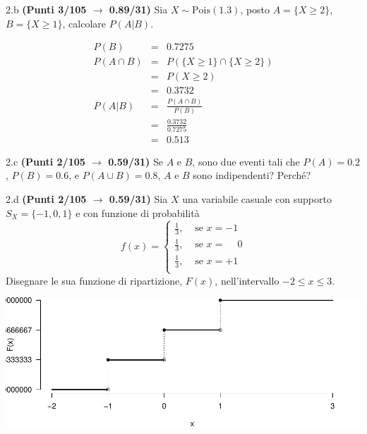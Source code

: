 \documentclass[
  11pt,
]{book}
\theoremstyle{mytheoremstyle}
\theoremstyle{mydefstyle}
\newenvironment{sol}
  {
  \begin{tcolorbox}[enhanced,breakable,arc=0.1mm,boxrule=1pt,colback=white,colframe=iblue,
  title=\bf \fontfamily{lmss}\selectfont \hspace{.5 cm} Soluzione,drop fuzzy shadow]

}{
\end{tcolorbox}
  }
\begin{document}
2.b \textbf{(Punti 3/105 \(\rightarrow\) 0.89/31)} Sia \(X\sim\text{Pois}(1.3)\), posto \(A=\{X\geq 2\}\), \(B=\{X\geq 1\}\), calcolare \(P(A|B)\).

\begin{sol}
\begin{eqnarray*}
  P(B) &=&  0.7275\\
  P(A\cap B) &=& P( \{X \geq 1\} \cap \{X \geq 2\})\\
             &=& P(  X \geq 2)\\
             &=& 0.3732\\
  P(A|B)     &=& \frac{P(A\cap B)}{P(B)}\\
             &=& \frac{0.3732}{0.7275}\\
             &=& 0.513
\end{eqnarray*}

\end{sol}

2.c \textbf{(Punti 2/105 \(\rightarrow\) 0.59/31)} Se \(A\) e \(B\), sono due eventi tali che \(P(A)=0.2\), \(P(B)=0.6\), e \(P(A\cup B)=0.8\), \(A\) e \(B\) sono indipendenti? Perché?

2.d \textbf{(Punti 2/105 \(\rightarrow\) 0.59/31)} Sia \(X\) una variabile casuale con supporto \(S_X=\{-1,0,1\}\) e con funzione di probabilità
\[
f(x)=\begin{cases}
\frac 13, &\text{ se $x=-1$}\\
\frac 13, &\text{ se $x=\phantom{-} 0$}\\
\frac 13, &\text{ se $x=+ 1$}\\
\end{cases}
\]
Disegnare le sua funzione di ripartizione, \(F(x)\), nell'intervallo \(-2\leq x\leq 3\).

\begin{sol}

\begin{center}\includegraphics{Esami_passati_con_soluzioni_files/figure-latex/2024-119-1} \end{center}

\end{sol}
\end{document}
